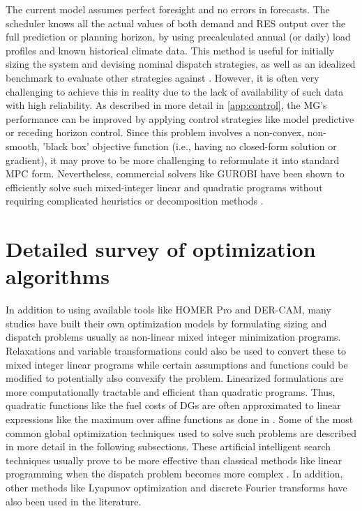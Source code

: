 \documentclass[final,3p,times]{elsarticle}
\begin{document}
The current model assumes perfect foresight and no errors in forecasts. The scheduler knows all the actual values of both demand and RES output over the full prediction or planning horizon, by using precalculated annual (or daily) load profiles and known historical climate data. This method is useful for initially sizing the system and devising nominal dispatch strategies, as well as an idealized benchmark to evaluate other strategies against \cite{parisio2014}. However, it is often very challenging to achieve this in reality due to the lack of availability of such data with high reliability. As described in more detail in \cref{app:control}, the MG's performance can be improved by applying control strategies like model predictive or receding horizon control. Since this problem involves a non-convex, non-smooth, 'black box' objective function (i.e., having no closed-form solution or gradient), it may prove to be more challenging to reformulate it into standard MPC form. Nevertheless, commercial solvers like GUROBI have been shown to efficiently solve such mixed-integer linear and quadratic programs without requiring complicated heuristics or decomposition methods \cite{parisio2014}. 

\section{Detailed survey of optimization algorithms \label{app:opt_alg}}

In addition to using available tools like HOMER Pro and DER-CAM, many studies have built their own optimization models by formulating sizing and dispatch problems usually as non-linear mixed integer minimization programs. Relaxations and variable transformations could also be used to convert these to mixed integer linear programs while certain assumptions and functions could be modified to potentially also convexify the problem. Linearized formulations are more computationally tractable and efficient than quadratic programs. Thus, quadratic functions like the fuel costs of DGs are often approximated to linear expressions like the maximum over affine functions as done in \cite{parisio2014}. Some of the most common global optimization techniques used to solve such problems are described in more detail in the following subsections. These artificial intelligent search techniques usually prove to be more effective than classical methods like linear programming when the dispatch problem becomes more complex \cite{Qu2018}. In addition, other methods like Lyapunov optimization \cite{pathak2017} and discrete Fourier transforms \cite{dft} have also been used in the literature.
\end{document}
